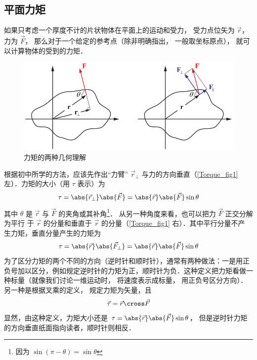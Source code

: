 

\subsection{平面力矩}

如果只考虑一个厚度不计的片状物体在平面上的运动和受力， 受力点位矢为 $\vec r$， 力为 $\vec F$， 那么对于一个给定的参考点（除非明确指出， 一般取坐标原点）， 就可以计算物体的受到的力矩．

\begin{figure}[ht]
\centering
\includegraphics[width=13cm]{./figures/Torque1.pdf}
\caption{力矩的两种几何理解}\label{Torque_fig1}
\end{figure}

根据初中所学的方法，应该先作出“力臂” $\vec r_ \bot$ 与力的方向垂直（\autoref{Torque_fig1} 左）．力矩的大小（用 $\tau$ 表示）为
\begin{equation}\label{Torque_eq2}
\tau = \abs{\vec r_ \bot } \abs{\vec F} = \abs{\vec r} \abs{\vec F} \sin \theta 
\end{equation}
其中 $\theta $ 是 $\vec r$ 与 $\vec F$ 的夹角或其补角\footnote{因为 $\sin(\pi - \theta) = \sin\theta$}． 从另一种角度来看，也可以把力 $\vec F$ 正交分解为平行
于 $\vec r$ 的分量和垂直于 $\vec r$ 的分量（\autoref{Torque_fig1} 右）．其中平行分量不产
生力矩，垂直分量产生的力矩为
\begin{equation}\label{Torque_eq1}
\tau = \abs{\vec r} \abs{\vec F_ \bot } = \abs{\vec r} \abs{\vec F} \sin \theta 
\end{equation}
为了区分力矩的两个不同的方向（逆时针和顺时针），通常有两种做法：一是用正负号加以区分，例如规定逆时针的力矩为正，顺时针为负．这种定义把力矩看做一种标量（就像我们讨论一维运动时， 将速度表示成标量， 用正负号区分方向）．另一种是根据叉乘的定义， 规定力矩为矢量，且
\begin{equation}\label{Torque_eq3}
\vec \tau = \vec r \cross \vec F
\end{equation}
显然，由这种定义，力矩大小还是 $\tau = \abs{\vec r} \abs{\vec F}\sin \theta$， 但是逆时针力矩的方向垂直纸面指向读者，顺时针则相反．

